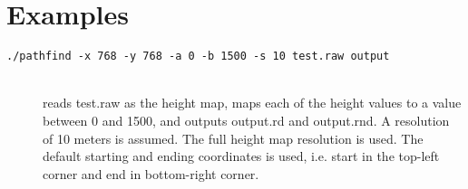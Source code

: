 \section*{Examples}

\begin{description}
\item[\texttt{./pathfind -x 768 -y 768 -a 0 -b 1500 -s 10 test.raw output}] \hfill\\
reads test.raw as the height map, maps each of the height values to a value between 0 and 1500, and outputs output.rd and output.rnd. A resolution of 10 meters is assumed. The full height map resolution is used. The default starting and ending coordinates is used, i.e. start in the top-left corner and end in bottom-right corner.

\end{description}

